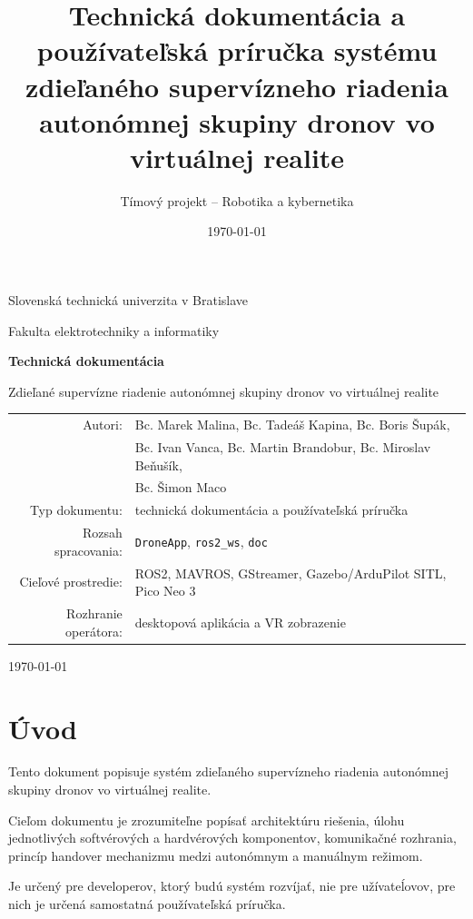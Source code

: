 \documentclass[a4paper,12pt]{article}
\title{\textbf{Technická dokumentácia a používateľská príručka systému zdieľaného supervízneho riadenia autonómnej skupiny dronov vo virtuálnej realite}}
\author{Tímový projekt -- Robotika a kybernetika}
\date{\today}
\begin{document}
\begin{titlepage}
    \centering
    \vspace*{2.2cm}
    {\Large Slovenská technická univerzita v Bratislave\par}
    {\large Fakulta elektrotechniky a informatiky\par}
    \vspace{1.7cm}
    {\Huge\bfseries Technická dokumentácia\par}
    \vspace{0.5cm}
    {\LARGE Zdieľané supervízne riadenie autonómnej skupiny dronov vo virtuálnej realite\par}
    \vspace{1.8cm}
    \begin{tabular}{rl}
        Autori: & Bc. Marek Malina, Bc. Tadeáš Kapina, Bc. Boris Šupák, \\
         & Bc. Ivan Vanca, Bc. Martin Brandobur, Bc. Miroslav Beňušík, \\ 
         & Bc. Šimon Maco \\
        Typ dokumentu: & technická dokumentácia a používateľská príručka \\
        Rozsah spracovania: & \texttt{DroneApp}, \texttt{ros2\_ws}, \texttt{doc} \\
        Cieľové prostredie: & ROS2, MAVROS, GStreamer, Gazebo/ArduPilot SITL, Pico Neo 3 \\
        Rozhranie operátora: & desktopová aplikácia a VR zobrazenie \\
    \end{tabular}
    \vfill
    {\large \today\par}
\end{titlepage}

\tableofcontents
\newpage

\section{Úvod}

Tento dokument popisuje systém zdieľaného supervízneho riadenia autonómnej skupiny dronov vo virtuálnej realite. 

Cieľom dokumentu je zrozumiteľne popísať architektúru riešenia, úlohu jednotlivých softvérových a hardvérových komponentov, komunikačné rozhrania, princíp handover mechanizmu medzi autonómnym a manuálnym režimom.

Je určený pre developerov, ktorý budú systém rozvíjať, nie pre užívateĺovov, pre nich je určená samostatná používateľská príručka.
\end{document}
